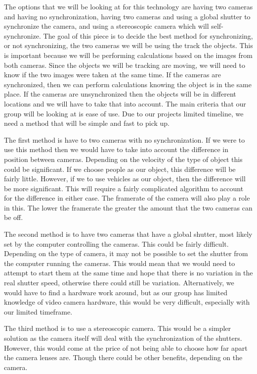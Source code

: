 \documentclass[onecolumn, draftclsnofoot,10pt, compsoc]{IEEEtran}
\begin{document}
The options that we will be looking at for this technology are having two cameras and having no synchronization, having two cameras and using a global shutter to synchronize the camera, and using a stereoscopic camera which will self-synchronize.
The goal of this piece is to decide the best method for synchronizing, or not synchronizing, the two cameras we will be using the track the objects.
This is important because we will be performing calculations based on the images from both cameras. 
Since the objects we will be tracking are moving, we will need to know if the two images were taken at the same time.
If the cameras are synchronized, then we can perform calculations knowing the object is in the same place.
If the cameras are unsynchronized then the objects will be in different locations and we will have to take that into account.
The main criteria that our group will be looking at is ease of use.
Due to our projects limited timeline, we need a method that will be simple and fast to pick up.

The first method is have to two cameras with no synchronization.
If we were to use this method then we would have to take into account the difference in position between cameras.
Depending on the velocity of the type of object this could be significant.
If we choose people as our object, this difference will be fairly little.
However, if we to use vehicles as our object, then the difference will be more significant.
This will require a fairly complicated algorithm to account for the difference in either case.
The framerate of the camera will also play a role in this.
The lower the framerate the greater the amount that the two cameras can be off.

The second method is to have two cameras that have a global shutter, most likely set by the computer controlling the cameras.
This could be fairly difficult.
Depending on the type of camera, it may not be possible to set the shutter from the computer running the cameras.
This would mean that we would need to attempt to start them at the same time and hope that there is no variation in the real shutter speed, otherwise there could still be variation.
Alternatively, we would have to find a hardware work around, but as our group has limited knowledge of video camera hardware, this would be very difficult, especially with our limited timeframe.

The third method is to use a stereoscopic camera.
This would be a simpler solution as the camera itself will deal with the synchronization of the shutters.
However, this would come at the price of not being able to choose how far apart the camera lenses are.
Though there could be other benefits, depending on the camera.
\end{document}
